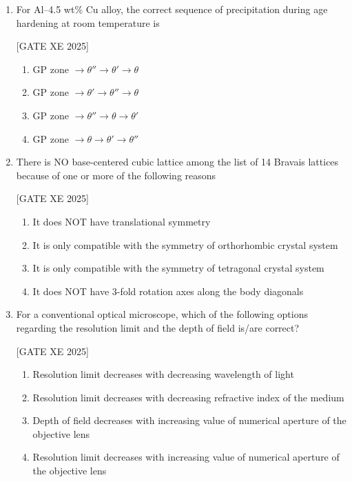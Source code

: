 \documentclass[journal,12pt,onecolumn]{IEEEtran}
\theoremstyle{remark}
\begin{document}
\begin{enumerate}
\item For Al–4.5 wt\% Cu alloy, the correct sequence of precipitation during age hardening at room temperature is

\hfill[GATE XE 2025]

\begin{multicols}{2}
\begin{enumerate}
\item GP zone $\to \theta'' \to \theta' \to \theta$
\item GP zone $\to \theta' \to \theta'' \to \theta$
\item GP zone $\to \theta'' \to \theta \to \theta'$
\item GP zone $\to \theta \to \theta' \to \theta''$
\end{enumerate}
\end{multicols}

\item There is NO base-centered cubic lattice among the list of 14 Bravais lattices because of one or more of the following reasons

\hfill[GATE XE 2025]

\begin{multicols}{2}
\begin{enumerate}
\item It does NOT have translational symmetry
\item It is only compatible with the symmetry of orthorhombic crystal system
\item It is only compatible with the symmetry of tetragonal crystal system
\item It does NOT have 3-fold rotation axes along the body diagonals
\end{enumerate}
\end{multicols}

\item For a conventional optical microscope, which of the following options regarding the resolution limit and the depth of field is/are correct?

\hfill[GATE XE 2025]

\begin{multicols}{2}
\begin{enumerate}
\item Resolution limit decreases with decreasing wavelength of light
\item Resolution limit decreases with decreasing refractive index of the medium
\item Depth of field decreases with increasing value of numerical aperture of the objective lens
\item Resolution limit decreases with increasing value of numerical aperture of the objective lens
\end{enumerate}
\end{multicols}


\end{enumerate}
\end{document}
